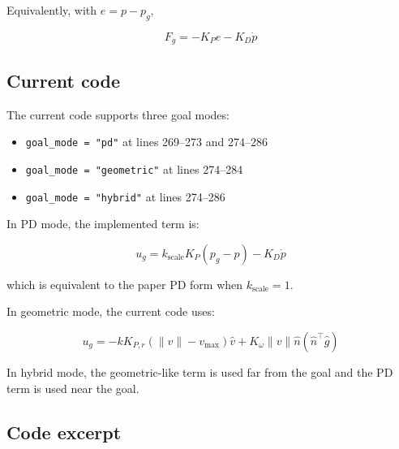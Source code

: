 \documentclass[11pt]{article}
\begin{document}
Equivalently, with \(e = p - p_g\),

\begin{equation}
F_g = -K_P e - K_D \dot{p}
\end{equation}

\subsection*{Current code}

The current code supports three goal modes:

\begin{itemize}[leftmargin=*]
  \item \texttt{goal\_mode = "pd"} at lines 269--273 and 274--286
  \item \texttt{goal\_mode = "geometric"} at lines 274--284
  \item \texttt{goal\_mode = "hybrid"} at lines 274--286
\end{itemize}

In PD mode, the implemented term is:

\begin{equation}
u_g = k_{\text{scale}} K_P (p_g - p) - K_D \dot{p}
\end{equation}

which is equivalent to the paper PD form when \(k_{\text{scale}} = 1\).

In geometric mode, the current code uses:

\begin{equation}
u_g = -k K_{P,r} (\lVert v \rVert - v_{\max}) \hat{v}
      + K_{\omega} \lVert v \rVert \hat{n} (\hat{n}^{\top}\hat{g})
\end{equation}

In hybrid mode, the geometric-like term is used far from the goal and the PD
term is used near the goal.

\subsection*{Code excerpt}
\end{document}

